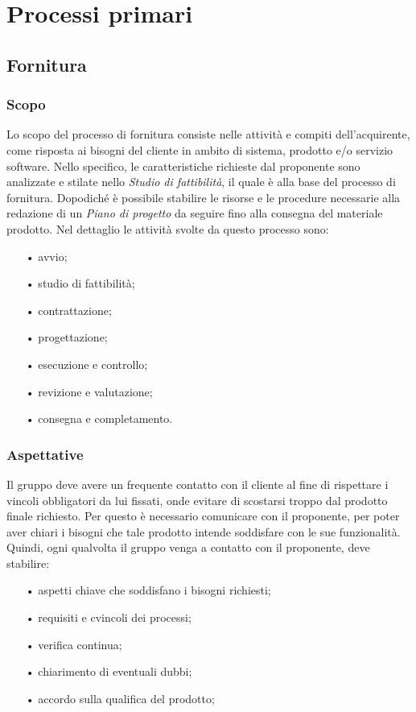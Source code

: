\section{Processi primari}
	\subsection{Fornitura}
		\subsubsection{Scopo}
		Lo scopo del processo di fornitura consiste nelle attività e compiti dell'acquirente, come risposta ai bisogni del cliente in ambito di sistema, prodotto e/o servizio software. Nello specifico, le caratteristiche richieste dal proponente sono analizzate e stilate nello \textit{Studio di fattibilità}, il quale è alla base del processo di fornitura. Dopodiché è possibile stabilire le risorse e le procedure necessarie alla redazione di un \textit{Piano di progetto} da seguire fino alla consegna del materiale prodotto.
		Nel dettaglio le attività svolte da questo processo sono:
		\begin{itemize}
			\item[•] avvio;
			\item[•] studio di fattibilità;
			\item[•] contrattazione;
			\item[•] progettazione;
			\item[•] esecuzione e controllo;
			\item[•] revizione e valutazione;
			\item[•] consegna e completamento.
		\end{itemize}
		\subsubsection{Aspettative}
		Il gruppo deve avere un frequente contatto con il cliente al fine di rispettare i vincoli obbligatori da lui fissati, onde evitare di scostarsi troppo dal prodotto finale richiesto. Per questo è necessario comunicare con il proponente, per poter aver chiari i bisogni che tale prodotto intende soddisfare con le sue funzionalità.
		Quindi, ogni qualvolta il gruppo venga a contatto con il proponente, deve stabilire:
		\begin{itemize}
			\item[•] aspetti chiave che soddisfano i bisogni richiesti;
			\item[•] requisiti e cvincoli dei processi;
			\item[•] verifica continua;
			\item[•] chiarimento di eventuali dubbi;
			\item[•] accordo sulla qualifica del prodotto;
			\end{itemize} 
